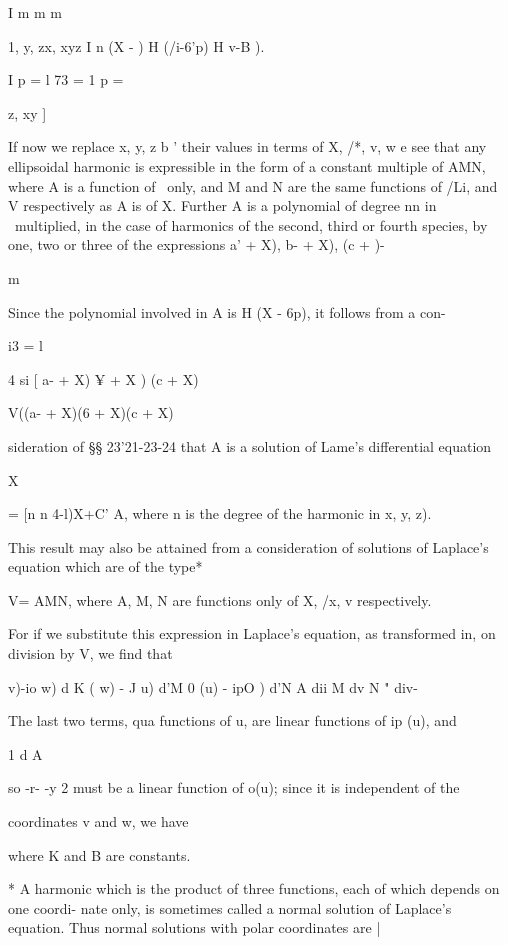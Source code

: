 {{{I m m m

1, y, zx, xyz I n (X - ) H (/i-6'p) H v-B ).

I p = l 73 = 1 p = \

z, xy ]

If now we replace x, y, z b ' their values in terms of X, /*, v, w e
see that any ellipsoidal harmonic is expressible in the form of a
constant multiple of AMN, where A is a function of \ only, and M and N
are the same functions of /Li, and V respectively as A is of X.
Further A is a polynomial of degree nn in \ multiplied, in the case of
harmonics of the second, third or fourth species, by one, two or three
of the expressions \/ a' + X), \/ b- + X), \/(c + )-

m

Since the polynomial involved in A is H (X - 6p), it follows from a
con-

i3 = l

4 si [ a- + X) ¥ + X ) (c + X)

V((a- + X)(6 + X)(c + X)

sideration of §§ 23'21-23-24 that A is a solution of Lame's
differential equation

X

= [n n 4-l)X+C' A, where n is the degree of the harmonic in x, y, z).

This result may also be attained from a consideration of solutions of
Laplace's equation which are of the type*

V= AMN, where A, M, N are functions only of X, /x, v respectively.

For if we substitute this expression in Laplace's equation, as
transformed in, on division by V, we find that

  v)-io w) d K ( w) - J u) d'M 0 (u) - ipO ) d'N A dii M dv N " div-

The last two terms, qua functions of u, are linear functions of ip
(u), and

1 d A

so -r- -y 2 must be a linear function of o(u); since it is independent
of the

coordinates v and w, we have

where K and B are constants.

* A harmonic which is the product of three functions, each of which
depends on one coordi- nate only, is sometimes called a normal
solution of Laplace's equation. Thus normal solutions with polar
coordinates are |

}}}
